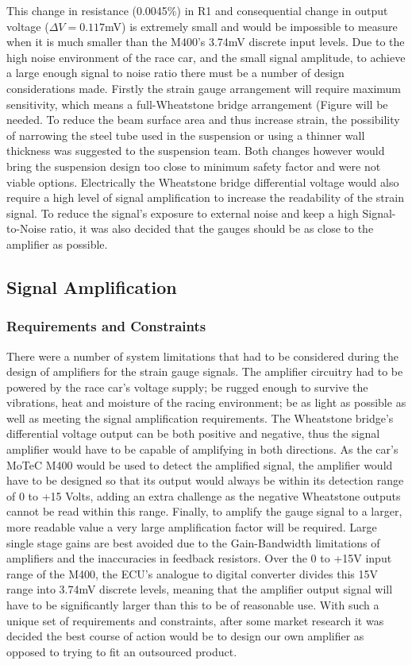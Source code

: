 This change in resistance (0.0045\%) in R1 and consequential change in output voltage ($\Delta V = 0.117$mV) is extremely small and would be impossible to measure when it is much smaller than the M400's 3.74mV discrete input levels. Due to the high noise environment of the race car, and the small signal amplitude, to achieve a large enough signal to noise ratio there must be a number of design considerations made. Firstly the strain gauge arrangement will require maximum sensitivity, which means a full-Wheatstone bridge arrangement (Figure 
will be needed.
To reduce the beam surface area and thus increase strain, the possibility of narrowing the steel tube used in the suspension or using a thinner wall thickness was suggested to the suspension team. Both changes however would bring the suspension design too close to minimum safety factor and were not viable options. Electrically the Wheatstone bridge differential voltage would also require a high level of signal amplification to increase the readability of the strain signal. To reduce the signal's exposure to external noise and keep a high Signal-to-Noise ratio, it was also decided that the gauges should be as close to the amplifier as possible.

\subsection{Signal Amplification}
\subsubsection{Requirements and Constraints}
There were a number of system limitations that had to be considered during the design of amplifiers for the strain gauge signals. The amplifier circuitry had to be powered by the race car's voltage supply; be rugged enough to survive the vibrations, heat and moisture of the racing environment; be as light as possible as well as meeting the signal amplification requirements. The Wheatstone bridge's differential voltage output can be both positive and negative, thus the signal amplifier would have to be capable of amplifying in both directions. As the car's MoTeC M400 would be used to detect the amplified signal, the amplifier would have to be designed so that its output would always be within its detection range of 0 to +15 Volts, adding an extra challenge as the negative Wheatstone outputs cannot be read within this range. Finally, to amplify the gauge signal to a larger, more readable value a very large amplification factor will be required. Large single stage gains are best avoided due to the Gain-Bandwidth limitations of amplifiers and the inaccuracies in feedback resistors. Over the 0 to +15V input range of the M400, the ECU's analogue to digital converter divides this 15V range into 3.74mV discrete levels, meaning that the amplifier output signal will have to be significantly larger than this to be of reasonable use. With such a unique set of requirements and constraints, after some market research it was decided the best course of action would be to design our own amplifier as opposed to trying to fit an outsourced product.

